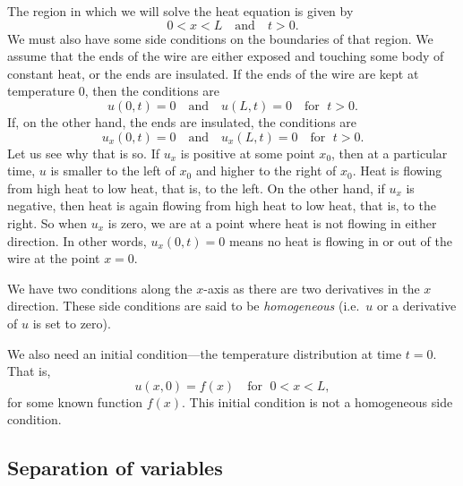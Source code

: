 \begin{mywrapfigsimp}[10]{2.25in}{2.55in}
\noindent
{}
\end{mywrapfigsimp}
The region in which we will solve the heat equation is given by 
\begin{equation*}
0 < x < L \quad \text{and} \quad t > 0 .
\end{equation*}
We must also have some side conditions on the boundaries of that region.
We assume that the ends of the wire are either exposed 
and touching some body of constant heat, or the ends are insulated.
If the ends of the wire are kept at temperature 0, then
the conditions are
\begin{equation*}
u(0,t) = 0 \quad \text{and} \quad u(L,t) = 0
\quad \text{for } \; t > 0.
\end{equation*}
If, on the other hand, the ends are insulated, the conditions are
\begin{equation*}
u_x(0,t) = 0 \quad \text{and} \quad u_x(L,t) = 0
\quad \text{for } \; t > 0 .
\end{equation*}
Let us see why that is so.
If $u_x$ is positive at some point $x_0$, then at a particular time,
$u$ is smaller to the left of $x_0$ and higher to the right of $x_0$.
Heat is flowing from high heat to low heat, that is, to the left.
On the other hand, if $u_x$ is negative, then heat is again flowing
from high heat to low
heat, that is, to the right.  So when $u_x$ is zero,
we are at a point where 
heat is not flowing in either direction.
In other words, $u_x(0,t) = 0$ means
no heat is flowing in or out of the wire at the point $x=0$.

We have two conditions along the $x$-axis as there are
two derivatives in the $x$ direction.
These side conditions are said to be
\emph{homogeneous}
(i.e.\ $u$ or a derivative of $u$ is set to zero).

We also need an initial condition---the temperature distribution
at time $t=0$.  That is,
\begin{equation*}
u(x,0) = f(x)
\quad \text{for } \; 0 < x < L ,
\end{equation*}
for some known function $f(x)$.
This initial condition is not a homogeneous side condition.

\subsection{Separation of variables}

